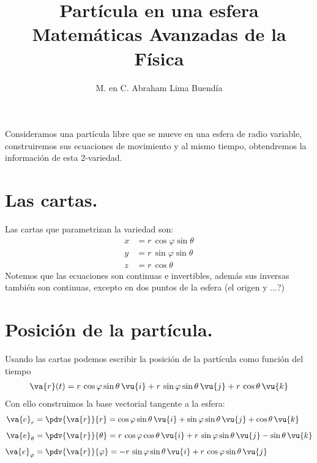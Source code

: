 
\title{Partícula en una esfera\\ \large{Matemáticas Avanzadas de la Física}\vspace{-3ex}}
\author{M. en C. Abraham Lima Buendía}
\date{ }

\vspace{-4cm}
\maketitle
\fontsize{14}{14}\selectfont
Consideramos una partícula libre que se mueve en una esfera de radio variable, construiremos sus ecuaciones de movimiento y al mismo tiempo, obtendremos la información de esta 2-variedad.
\section{Las cartas.}
Las cartas que parametrizan la variedad son:
\begin{align*}
x &= r \, \cos \varphi \sin \theta \\
y &= r \, \sin \varphi \sin \theta \\
z &= r \, \cos \theta
\end{align*}
Notemos que las ecuaciones son continuas e invertibles, además sus inversas también son continuas, excepto en dos puntos de la esfera (el origen y ...?)
\section{Posición de la partícula.}
Usando las cartas podemos escribir la posición de la partícula como función del tiempo
\begin{align*}
\va{r} (t) = r \, \cos \varphi \sin \theta \, \vu{i} + r \, \sin \varphi \sin \theta \, \vu{j} + r \, \cos \theta \, \vu{k}
\end{align*}
Con ello construimos la base vectorial tangente a la esfera:
\begin{align*}
\va{e}_{r} &= \pdv{\va{r}}{r} = \cos \varphi \sin \theta \, \vu{i} + \sin \varphi \sin \theta \, \vu{j} + \cos \theta \, \vu{k} \\[0.5em]
\va{e}_{\theta} &= \pdv{\va{r}}{\theta} = r\, \cos \varphi \cos \theta \, \vu{i} + r \, \sin \varphi \sin \theta \, \vu{j} - \sin \theta \, \vu{k} \\[0.5em]
\va{e}_{\varphi} &= \pdv{\va{r}}{\varphi} = - r \, \sin \varphi \sin \theta \, \vu{i} + r \, \cos \varphi \sin \theta \, \vu{j}
\end{align*}
